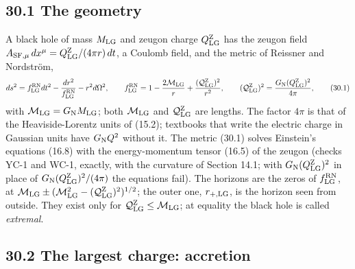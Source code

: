 \documentclass[
  10pt,
]{article}
\begin{document}
\hypertarget{the-geometry}{%
\subsection{30.1 The geometry}\label{the-geometry}}

A black hole of mass \(M_{\rm LG}\) and zeugon charge
\(Q^{\rm Z}_{\rm LG}\) has the zeugon field
\(A_{{\rm SF},\mu}\,dx^\mu=Q^{\rm Z}_{\rm LG}/(4\pi r)\,dt\), a Coulomb
field, and the metric of Reissner and Nordström,
\[ds^2=f^{\rm RN}_{\rm LG}dt^2-\frac{dr^2}{f^{\rm RN}_{\rm LG}}-r^2d\Omega^2,\qquad f^{\rm RN}_{\rm LG}=1-\frac{2\mathcal M_{\rm LG}}r+\frac{(\mathcal Q^{\rm Z}_{\rm LG})^2}{r^2},\qquad(\mathcal Q^{\rm Z}_{\rm LG})^2=\frac{G_{\rm N}(Q^{\rm Z}_{\rm LG})^2}{4\pi},\tag{30.1}\]
with \(\mathcal M_{\rm LG}=G_{\rm N}M_{\rm LG}\); both
\(\mathcal M_{\rm LG}\) and \(\mathcal Q^{\rm Z}_{\rm LG}\) are lengths.
The factor \(4\pi\) is that of the Heaviside-Lorentz units of (15.2);
textbooks that write the electric charge in Gaussian units have
\(G_{\rm N}Q^2\) without it. The metric (30.1) solves Einstein's
equations (16.8) with the energy-momentum tensor (16.5) of the zeugon
(checks YC-1 and WC-1, exactly, with the curvature of Section 14.1; with
\(G_{\rm N}(Q^{\rm Z}_{\rm LG})^2\) in place of
\(G_{\rm N}(Q^{\rm Z}_{\rm LG})^2/(4\pi)\) the equations fail). The
horizons are the zeros of \(f^{\rm RN}_{\rm LG}\), at
\(\mathcal M_{\rm LG}\pm(\mathcal M_{\rm LG}^2-(\mathcal Q^{\rm Z}_{\rm LG})^2)^{1/2}\);
the outer one, \(r_{+,\rm LG}\), is the horizon seen from outside. They
exist only for \(\mathcal Q^{\rm Z}_{\rm LG}\le\mathcal M_{\rm LG}\); at
equality the black hole is called \emph{extremal}.

\hypertarget{the-largest-charge-accretion}{%
\subsection{30.2 The largest charge:
accretion}\label{the-largest-charge-accretion}}
\end{document}
